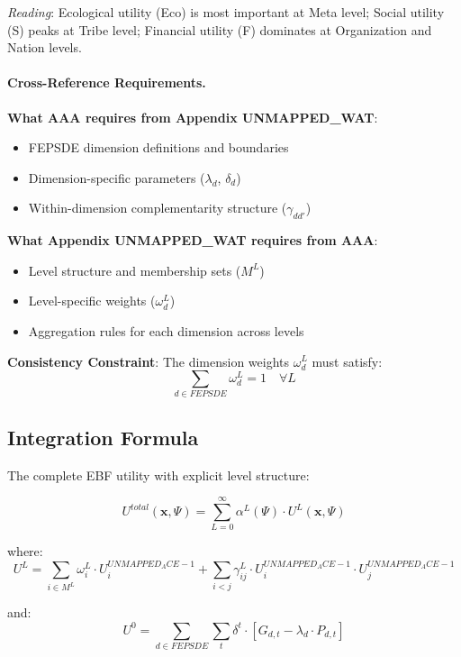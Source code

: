 \textit{Reading}: Ecological utility (Eco) is most important at Meta level; Social utility (S) 
peaks at Tribe level; Financial utility (F) dominates at Organization and Nation levels.

\paragraph{Cross-Reference Requirements.}

\begin{tcolorbox}[colback=yellow!5!white, colframe=yellow!75!black, title=Required Coordination: AAA $\leftrightarrow$ C]
\textbf{What AAA requires from Appendix UNMAPPED_WAT}:
\begin{itemize}[nosep]
\item FEPSDE dimension definitions and boundaries
\item Dimension-specific parameters ($\lambda_d$, $\delta_d$)
\item Within-dimension complementarity structure ($\gamma_{dd'}$)
\end{itemize}

\textbf{What Appendix UNMAPPED_WAT requires from AAA}:
\begin{itemize}[nosep]
\item Level structure and membership sets ($M^L$)
\item Level-specific weights ($\omega^L_d$)
\item Aggregation rules for each dimension across levels
\end{itemize}

\textbf{Consistency Constraint}:
The dimension weights $\omega^L_d$ must satisfy:
\begin{equation}
\sum_{d \in FEPSDE} \omega^L_d = 1 \quad \forall L
\end{equation}
\end{tcolorbox}

\subsection{Integration Formula}

The complete EBF utility with explicit level structure:

\begin{tcolorbox}[colback=blue!5!white, colframe=blue!75!black, title=Complete Multi-Level Utility]
\begin{equation}
\boxed{
U^{total}(\mathbf{x}, \Psi) = \sum_{L=0}^{\infty} \alpha^L(\Psi) \cdot U^L(\mathbf{x}, \Psi)
}
\end{equation}

where:
\begin{equation}
U^L = \sum_{i \in M^L} \omega^L_i \cdot U^{UNMAPPED_ACE-1}_i + \sum_{i < j} \gamma^L_{ij} \cdot U^{UNMAPPED_ACE-1}_i \cdot U^{UNMAPPED_ACE-1}_j
\end{equation}

and:
\begin{equation}
U^0 = \sum_{d \in FEPSDE} \sum_{t} \delta^t \cdot \left[ G_{d,t} - \lambda_d \cdot P_{d,t} \right]
\end{equation}
\end{tcolorbox}

